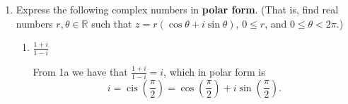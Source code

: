 \documentclass[11pt]{article}
\def\reals{\mathbb{R}}
\begin{document}
\begin{enumerate}
\begin{enumerate}
 \end{enumerate}

\item Express the following complex numbers in \textbf{polar form}. (That is, find real numbers $r,\theta\in\reals$ such that $z=r(\cos\theta + i\sin\theta)$, $0\leq r$, and $0\leq\theta<2\pi$.)
 
  \begin{enumerate}
   \item $\displaystyle\frac{1+i}{1-i}$
   \begin{Solution}
    From 1a we have that $\frac{1+i}{1-i} = i$, which in polar form is \[i=\operatorname{cis}\left(\frac{\pi}{2}\right) = \cos \left(\frac{\pi}{2}\right)+i\sin \left(\frac{\pi}{2}\right).\]
   \begin{center}
\end{center}
   \end{Solution}



\end{enumerate}
\end{enumerate}
\end{document}
